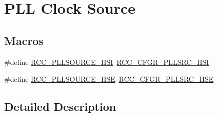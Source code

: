 \hypertarget{group___r_c_c___p_l_l___clock___source}{\section{P\-L\-L Clock Source}
\label{group___r_c_c___p_l_l___clock___source}
}
\subsection*{Macros}
\begin{DoxyCompactItemize}
\item 
\#define \hyperlink{group___r_c_c___p_l_l___clock___source_ga0e07703f1ccb3d60f8a47a2dc631c218}{R\-C\-C\-\_\-\-P\-L\-L\-S\-O\-U\-R\-C\-E\-\_\-\-H\-S\-I}~\hyperlink{group___peripheral___registers___bits___definition_ga915304a210fe2681353f5c201b66fb6b}{R\-C\-C\-\_\-\-C\-F\-G\-R\-\_\-\-P\-L\-L\-S\-R\-C\-\_\-\-H\-S\-I}
\item 
\#define \hyperlink{group___r_c_c___p_l_l___clock___source_ga197cea7fe5c2db26fe7fcdb0f99dd4d7}{R\-C\-C\-\_\-\-P\-L\-L\-S\-O\-U\-R\-C\-E\-\_\-\-H\-S\-E}~\hyperlink{group___peripheral___registers___bits___definition_ga5fd58409765f79b08b2b5d86a2c322f4}{R\-C\-C\-\_\-\-C\-F\-G\-R\-\_\-\-P\-L\-L\-S\-R\-C\-\_\-\-H\-S\-E}
\end{DoxyCompactItemize}


\subsection{Detailed Description}


